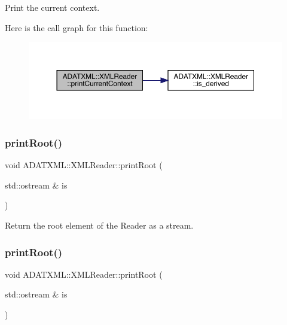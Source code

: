 Print the current context. 

Here is the call graph for this function\+:\nopagebreak
\begin{figure}[H]
\begin{center}
\leavevmode
\includegraphics[width=350pt]{db/d3f/classADATXML_1_1XMLReader_a424f9e30746b4fdc106b57b5ce95f7ec_cgraph}
\end{center}
\end{figure}
\mbox{\label{classADATXML_1_1XMLReader_a732a08c1605f8c01663105bb3586b575}} 
\subsubsection{\texorpdfstring{printRoot()}{printRoot()}\hspace{0.1cm}{\footnotesize\ttfamily [1/2]}}
{\footnotesize\ttfamily void A\+D\+A\+T\+X\+M\+L\+::\+X\+M\+L\+Reader\+::print\+Root (\begin{DoxyParamCaption}\item[{std\+::ostream \&}]{is }\end{DoxyParamCaption})}



Return the root element of the Reader as a stream. 

\mbox{\label{classADATXML_1_1XMLReader_a732a08c1605f8c01663105bb3586b575}} 
\subsubsection{\texorpdfstring{printRoot()}{printRoot()}\hspace{0.1cm}{\footnotesize\ttfamily [2/2]}}
{\footnotesize\ttfamily void A\+D\+A\+T\+X\+M\+L\+::\+X\+M\+L\+Reader\+::print\+Root (\begin{DoxyParamCaption}\item[{std\+::ostream \&}]{is }\end{DoxyParamCaption})}



